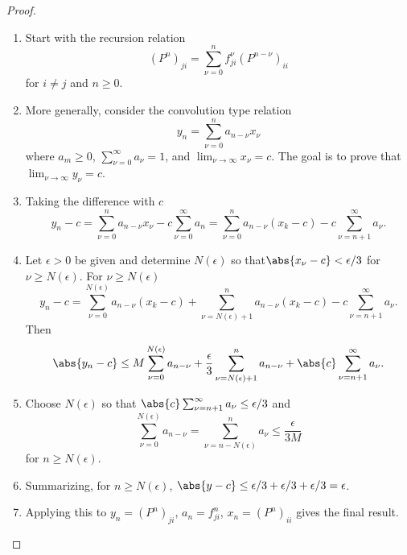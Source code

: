 \documentclass[12pt]{article}
\begin{document}
\begin{proof}
    \begin{enumerate}
        \item
            Start with the recursion relation
            \[
                (P^n)_{ji} = \sum\limits_{\nu=0}^n f^{\nu}_{ji} (P^{n-\nu})_
                {ii}
            \] for \( i \ne j \) and \( n \ge 0 \).
        \item
            More generally, consider the convolution type relation
            \[
                y_n = \sum\limits_{\nu=0}^n a_{n-\nu} x_{\nu}
            \] where \( a_m \ge 0 \), \( \sum_{\nu=0}^{\infty} a_\nu = 1
            \), and \( \lim_{\nu \to \infty} x_\nu = c \).  The goal is
            to prove that \( \lim_{\nu \to \infty} y_\nu = c \).
        \item
            Taking the difference with \( c \)
            \[
                y_n - c = \sum\limits_{\nu=0}^n a_{n-\nu} x_\nu -c \sum\limits_
                {\nu=0}^{\infty} a_n = \sum\limits_{\nu=0}^n a_{n-\nu} (x_k
                -c) - c \sum\limits_{\nu=n+1}^{\infty} a_\nu.
            \]
        \item
            Let \( \epsilon > 0 \) be given and determine \( N(\epsilon)
            \) so that\( \abs{x_{\nu} - c} < \epsilon/3 \) for \( \nu
            \ge N(\epsilon) \).  For \( \nu \ge N(\epsilon) \)
            \[
                y_n - c = \sum\limits_{\nu=0}^{N(\epsilon)} a_{n-\nu} (x_k
                -c) + \sum\limits_{\nu=N(\epsilon)+1}^n a_{n-\nu} (x_k
                -c)- c \sum\limits_{\nu=n+1}^{\infty} a_\nu.
            \] Then
            \[
                \abs{y_n - c} \le M \sum\limits_{\nu=0}^{N(\epsilon)} a_
                {n-\nu} + \frac{\epsilon}{3} \sum\limits_{\nu=N(\epsilon)+1}^n
                a_{n-\nu} + \abs{c} \sum\limits_{\nu=n+1}^{\infty} a_\nu.
            \]
        \item
            Choose \( N(\epsilon) \) so that \( \abs{c} \sum_{\nu=n+1}^
            {\infty} a_\nu \le \epsilon/3 \) and
            \[
                \sum\limits_{\nu=0}^{N(\epsilon)} a_{n-\nu} = \sum\limits_
                {\nu=n-N (\epsilon)}^n a_{\nu} \le \frac{\epsilon}{3M}
            \] for \( n \ge N(\epsilon) \).
        \item
            Summarizing, for \( n \ge N(\epsilon) \), \( \abs{y-c} \le
            \epsilon/3 + \epsilon/3 + \epsilon/3 = \epsilon \).
        \item
            Applying this to \( y_n = (P^n)_{ji} \), \( a_n = f^n_{ji} \),
            \( x_n = (P^n)_{ii} \) gives the final result.
    \end{enumerate}
\end{proof}
\end{document}
